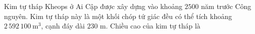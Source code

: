 \begin{ex}
Kim tự tháp Kheops ở Ai Cập được xây dựng vào khoảng $2500$ năm trước Công nguyên. Kim tự tháp này là một khối chóp tứ giác đều có thể tích khoảng $2\,592\,100\ \mathrm{m^3}$, cạnh đáy dài $230$ m. Chiều cao của kim tự tháp là
\end{ex}
